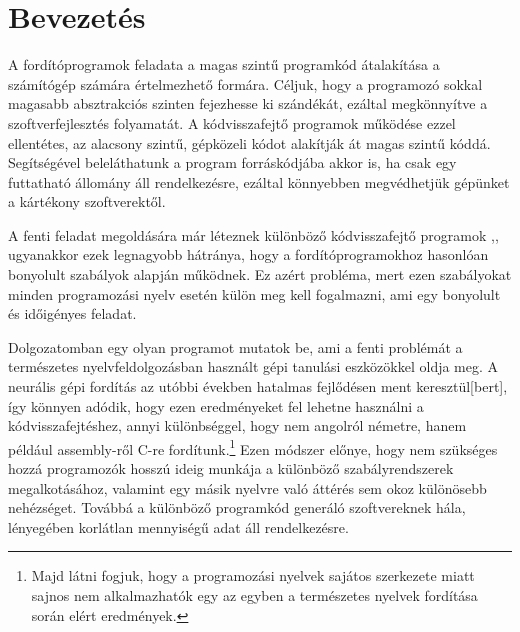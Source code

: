 \chapter{Bevezetés}
\label{ch:intro}

A fordítóprogramok feladata a magas szintű programkód átalakítása a számítógép számára értelmezhető formára. Céljuk, hogy a programozó sokkal magasabb absztrakciós szinten fejezhesse ki szándékát, ezáltal megkönnyítve a szoftverfejlesztés folyamatát. A kódvisszafejtő programok működése ezzel ellentétes, az alacsony szintű, gépközeli kódot alakítják át magas szintű kóddá. Segítségével beleláthatunk a program forráskódjába akkor is, ha csak egy futtatható állomány áll rendelkezésre, ezáltal könnyebben megvédhetjük gépünket a kártékony szoftverektől.

A fenti feladat megoldására már léteznek különböző kódvisszafejtő programok \cite{ghidra},\cite{binaryninja}, ugyanakkor ezek legnagyobb hátránya, hogy a fordítóprogramokhoz hasonlóan bonyolult szabályok alapján működnek. Ez azért probléma, mert ezen szabályokat minden programozási nyelv esetén külön meg kell fogalmazni, ami egy bonyolult és időigényes feladat.

Dolgozatomban egy olyan programot mutatok be, ami a fenti problémát a természetes nyelvfeldolgozásban használt gépi tanulási eszközökkel oldja meg. A neurális gépi fordítás az utóbbi években hatalmas fejlődésen ment keresztül[bert], így könnyen adódik, hogy ezen eredményeket fel lehetne használni a kódvisszafejtéshez, annyi különbséggel, hogy nem angolról németre, hanem például assembly-ről C-re fordítunk.\footnote{Majd látni fogjuk, hogy a programozási nyelvek sajátos szerkezete miatt sajnos nem alkalmazhatók egy az egyben a természetes nyelvek fordítása során elért eredmények.} Ezen módszer előnye, hogy nem szükséges hozzá programozók hosszú ideig munkája a különböző szabályrendszerek megalkotásához, valamint egy másik nyelvre való áttérés sem okoz különösebb nehézséget. Továbbá a különböző programkód generáló szoftvereknek\cite{??} hála, lényegében korlátlan mennyiségű adat áll rendelkezésre.
